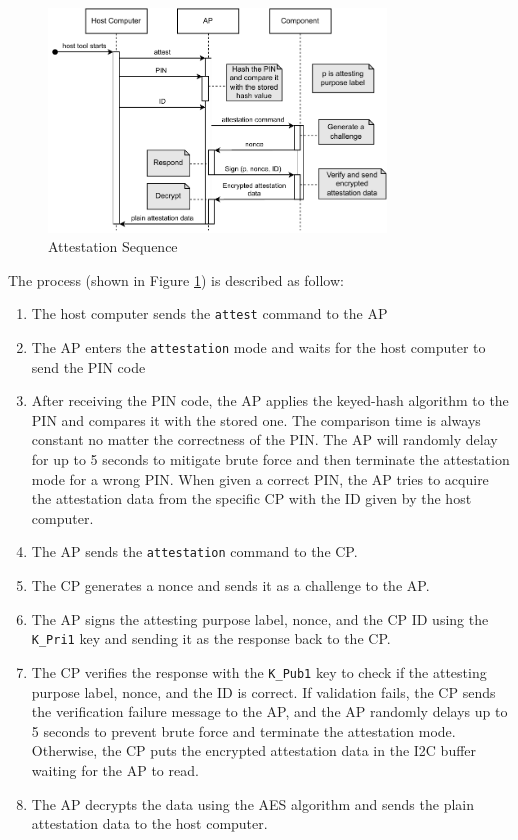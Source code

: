 \documentclass[11pt,oneside,onecolumn,letterpaper]{article}
\newcounter{alg}
\begin{document}
	\begin{figure}[h]
		\centering
		\includegraphics[width=0.8\textwidth]{pics/attest.pdf}
		\caption{Attestation Sequence}
		\label{fig:functionality_attest}
	\end{figure}
	
	The process (shown in Figure \ref{fig:functionality_attest}) is described as follow:
	\begin{enumerate}
		\item The host computer sends the \texttt{attest} command to the AP
		\item The AP enters the \texttt{attestation} mode and waits for the host computer to send the PIN code
		\item After receiving the PIN code,
		the AP applies the keyed-hash algorithm to the PIN and compares it with the stored one.
		The comparison time is always constant no matter the correctness of the PIN.
		The AP will randomly delay for up to 5 seconds to mitigate brute force and then terminate the attestation mode for a wrong PIN.
		When given a correct PIN,
		the AP tries to acquire the attestation data from the specific CP with the ID given by the host computer.
		\item The AP sends the \texttt{attestation} command to the CP.
		\item The CP generates a nonce and sends it as a challenge to the AP.
		\item The AP signs the attesting purpose label,
		nonce,
		and the CP ID using the \texttt{K\_Pri1} key and sending it as the response back to the CP.
		\item The CP verifies the response with the \texttt{K\_Pub1} key to check if the attesting purpose label,
		nonce,
		and the ID is correct.
		If validation fails,
		the CP sends the verification failure message to the AP,
		and the AP randomly delays up to 5 seconds to prevent brute force and terminate the attestation mode.
		Otherwise,
		the CP puts the encrypted attestation data in the I2C buffer waiting for the AP to read.
		\item The AP decrypts the data using the AES algorithm and sends the plain attestation data to the host computer.
	\end{enumerate}
	
\end{document}
